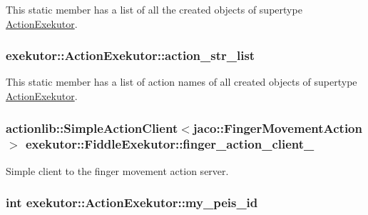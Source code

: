 \-This static member has a list of all the created objects of supertype \hyperlink{classexekutor_1_1ActionExekutor}{\-Action\-Exekutor}. 

\hypertarget{classexekutor_1_1ActionExekutor_a0dc39a7a2a3a67d2bdd366f9e6e682a2}{
\subsubsection[{action\-\_\-str\-\_\-list}]{ {\bf exekutor\-::\-Action\-Exekutor\-::action\-\_\-str\-\_\-list}}}\label{classexekutor_1_1ActionExekutor_a0dc39a7a2a3a67d2bdd366f9e6e682a2}


\-This static member has a list of action names of all created objects of supertype \hyperlink{classexekutor_1_1ActionExekutor}{\-Action\-Exekutor}. 

\hypertarget{classexekutor_1_1FiddleExekutor_aa3ec21cf41762393b0449c2281c47fb2}{
\subsubsection[{finger\-\_\-action\-\_\-client\-\_\-}]{\setlength{\rightskip}{0pt plus 5cm}actionlib\-::\-Simple\-Action\-Client$<$jaco\-::\-Finger\-Movement\-Action$>$ {\bf exekutor\-::\-Fiddle\-Exekutor\-::finger\-\_\-action\-\_\-client\-\_\-}}}\label{classexekutor_1_1FiddleExekutor_aa3ec21cf41762393b0449c2281c47fb2}


\-Simple client to the finger movement action server. 

\hypertarget{classexekutor_1_1ActionExekutor_a31644a88e4d0166c2d3a70bab9eb5b99}{
\subsubsection[{my\-\_\-peis\-\_\-id}]{\setlength{\rightskip}{0pt plus 5cm}int {\bf exekutor\-::\-Action\-Exekutor\-::my\-\_\-peis\-\_\-id}}}\label{classexekutor_1_1ActionExekutor_a31644a88e4d0166c2d3a70bab9eb5b99}


